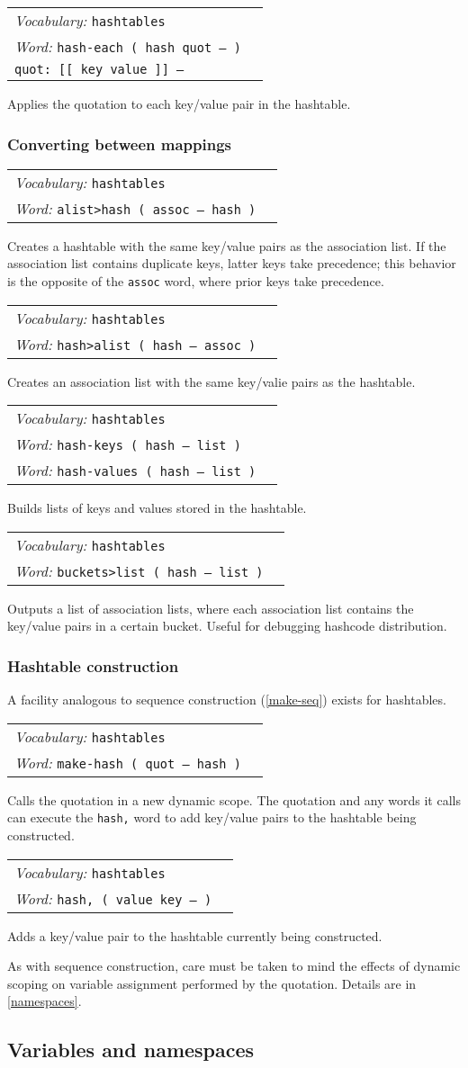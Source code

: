 \documentclass{book}
\newcommand{\vocabulary}[1]{\emph{Vocabulary:} \texttt{#1}&\\}
\newcommand{\ordinaryword}[2]{\index{\texttt{#1}}\emph{Word:} \texttt{#2}&\\}
\newcommand{\wordtable}[1]{

\begin{tabularx}{12cm}[t]{lX}
\hline
#1
\hline
\end{tabularx}

}
\begin{document}
\wordtable{
\vocabulary{hashtables}
\ordinaryword{hash-each}{hash-each ( hash quot -- )}
\texttt{quot:~[[ key value ]] --}\\
}
Applies the quotation to each key/value pair in the hashtable.

\subsubsection{Converting between mappings}

\wordtable{
\vocabulary{hashtables}
\ordinaryword{alist>hash}{alist>hash ( assoc -- hash )}
}
Creates a hashtable with the same key/value pairs as the association list. If the association list contains duplicate keys, latter keys take precedence; this behavior is the opposite of the \texttt{assoc} word, where prior keys take precedence.
\wordtable{
\vocabulary{hashtables}
\ordinaryword{hash>alist}{hash>alist ( hash -- assoc )}
}
Creates an association list with the same key/valie pairs as the hashtable.
\wordtable{
\vocabulary{hashtables}
\ordinaryword{hash-keys}{hash-keys ( hash -- list )}
\ordinaryword{hash-values}{hash-values ( hash -- list )}
}
Builds lists of keys and values stored in the hashtable.
\wordtable{
\vocabulary{hashtables}
\ordinaryword{buckets>list}{buckets>list ( hash -- list )}
}
Outputs a list of association lists, where each association list contains the key/value pairs in a certain bucket. Useful for debugging hashcode distribution.

\subsubsection{Hashtable construction}

A facility analogous to sequence construction (\ref{make-seq}) exists for hashtables.

\wordtable{
\vocabulary{hashtables}
\ordinaryword{make-hash}{make-hash ( quot -- hash )}
}
Calls the quotation in a new dynamic scope. The quotation and any words it calls can execute the \texttt{hash,} word to add key/value pairs to the hashtable being constructed.
\wordtable{
\vocabulary{hashtables}
\ordinaryword{hash,}{hash,~( value key -- )}
}
Adds a key/value pair to the hashtable currently being constructed.

As with sequence construction, care must be taken to mind the effects of dynamic scoping on variable assignment performed by the quotation. Details are in \ref{namespaces}.

\subsection{\label{namespaces}Variables and namespaces}
\end{document}
